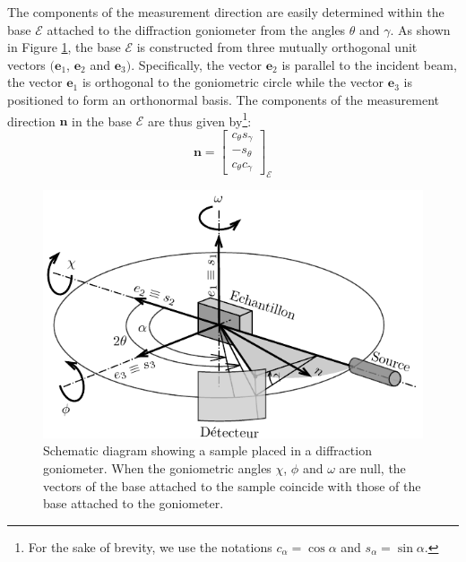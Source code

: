 \documentclass[french,a4paper]{report}
\begin{document}
The components of the measurement direction are easily determined within the base $\mathcal{E}$ attached to the diffraction goniometer from the angles $\theta$ and $\gamma$. As shown in Figure \ref{fig_bases}, the base $\mathcal{E}$ is constructed from three mutually orthogonal unit vectors $(\boldsymbol e_1$, $\boldsymbol e_2$ and $\boldsymbol e_3)$. Specifically, the vector $\boldsymbol e_2$ is parallel to the incident beam, the vector $\boldsymbol e_1$ is orthogonal to the goniometric circle while the vector $\boldsymbol e_3$ is positioned to form an orthonormal basis. The components of the measurement direction $\boldsymbol n$ in the base $\mathcal{E}$ are thus given by\footnote{For the sake of brevity, we use the notations $c_\alpha=\cos \alpha$ and $ s_\alpha=\sin \alpha$.}: 
\begin{equation}
\boldsymbol n =
\begin{bmatrix}
c_\theta s_\gamma \\
-s_\theta  \\
c_\theta c_\gamma
\end{bmatrix}_{\mathcal{E}}
\end{equation}

\begin{figure}
\centering
\includegraphics{figures/bases.pdf}
\caption{Schematic diagram showing a sample placed in a diffraction goniometer. When the goniometric angles $\chi$, $\phi$ and $\omega$ are null, the vectors of the base attached to the sample coincide with those of the base attached to the goniometer. }
\label{fig_bases}
\end{figure}
\end{document}
